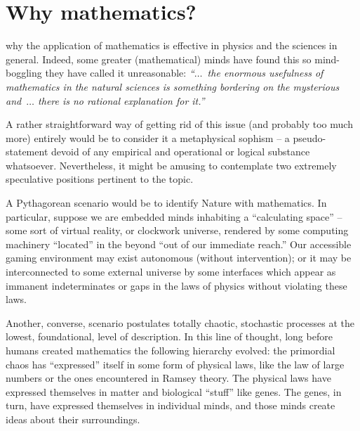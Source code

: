\chapter*{Why mathematics?}


 why the application of mathematics is effective in physics
and the sciences in general.
Indeed, some greater (mathematical) minds have found this so mind-boggling they have called it unreasonable\cite[-65mm]{wigner}: {\em
``$\ldots$~the enormous usefulness of mathematics in the natural sciences is something
bordering on the mysterious and~$\ldots$ there is no rational explanation for it.''}

{A rather straightforward way} of getting rid of this issue (and probably too much more) entirely
would be to consider it a metaphysical sophism\cite[-60mm]{Hume-Enquiry,Hahn1930,Carnap-1931-engl}
-- a  pseudo-statement devoid of any empirical and operational or logical substance whatsoever.
Nevertheless, it might be amusing to contemplate two extremely speculative positions pertinent to the topic.

{A Pythagorean scenario} would be to identify Nature with mathematics.
In particular, suppose we are embedded minds inhabiting
a ``calculating space''\cite[-18mm]{zuse-70} --
some sort of virtual reality, or clockwork universe, rendered by some computing machinery ``located'' in the beyond
``out of our immediate reach.''
Our accessible gaming environment may exist autonomous (without intervention); or it may be interconnected
to some external universe by some interfaces
which appear as immanent indeterminates or gaps in the laws of physics\cite[-32mm]{frank,franke}
without violating these laws.

{Another, converse, scenario} postulates totally chaotic, stochastic processes
at the lowest, foundational, level of description\cite[-13mm]{Exner-1908,Stoeltzner-1999,svozil-2018-was}.
In this line of thought, long before humans created mathematics the following hierarchy evolved:
the primordial chaos has ``expressed'' itself in some form of physical laws,
like the law of large numbers or the ones encountered in Ramsey theory.
The physical laws have expressed themselves in matter and biological ``stuff'' like genes.
The genes, in turn, have expressed themselves in individual minds,
and those minds create ideas about their surroundings\cite{berkeley}.

